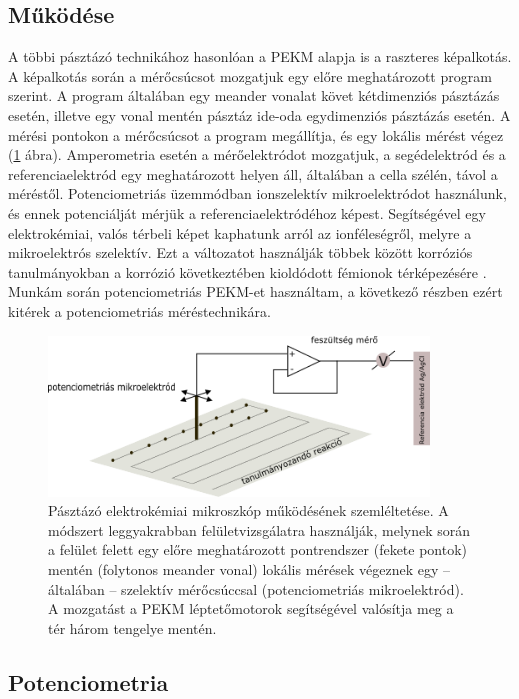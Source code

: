 \subsection{Működése}

A többi pásztázó technikához hasonlóan a PEKM alapja is a raszteres képalkotás. A képalkotás során a mérőcsúcsot mozgatjuk egy előre meghatározott program szerint. A program általában egy meander vonalat követ kétdimenziós pásztázás esetén, illetve egy vonal mentén pásztáz ide-oda egydimenziós pásztázás esetén. A mérési pontokon a mérőcsúcsot a program megállítja, és egy lokális mérést végez (\ref{fig:PEKM} ábra). Amperometria esetén a mérőelektródot mozgatjuk, a segédelektród és a referenciaelektród egy meghatározott helyen áll, általában a cella szélén, távol a méréstől. Potenciometriás üzemmódban ionszelektív mikroelektródot használunk, és ennek potenciálját mérjük a referenciaelektródéhoz képest. Segítségével egy elektrokémiai, valós térbeli képet kaphatunk arról az ionféleségről, melyre a mikroelektrós szelektív. Ezt a változatot használják többek között korróziós tanulmányokban a korrózió következtében kioldódott fémionok térképezésére \cite{bastos2010micropotentiometric, lamaka2008monitoring, karavai2010localized}. Munkám során potenciometriás PEKM-et használtam, a következő részben ezért kitérek a potenciometriás méréstechnikára.

\begin{figure}
\centering
\includegraphics[width=0.9\textwidth]{img/PEKM.png}
\caption{Pásztázó elektrokémiai mikroszkóp működésének szemléltetése. A módszert leggyakrabban felületvizsgálatra használják, melynek során a felület felett egy előre meghatározott pontrendszer (fekete pontok) mentén (folytonos meander vonal) lokális mérések végeznek egy -- általában -- szelektív mérőcsúccsal (potenciometriás mikroelektród). A mozgatást a PEKM léptetőmotorok segítségével valósítja meg a tér három tengelye mentén.}
\label{fig:PEKM}
\end{figure}


\subsection{Potenciometria}


